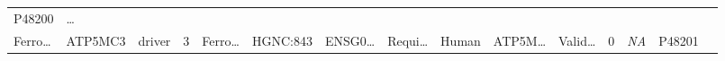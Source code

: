\documentclass[
]{article}
\begin{document}
\begin{longtable}[]{@{}lllllllllllllll@{}}
\begin{minipage}[t]{0.05\columnwidth}
P48200\strut
\end{minipage} & \begin{minipage}[t]{0.02\columnwidth}\raggedright
\ldots{}\strut
\end{minipage}\tabularnewline
\begin{minipage}[t]{0.05\columnwidth}\raggedright
Ferro\ldots{}\strut
\end{minipage} & \begin{minipage}[t]{0.04\columnwidth}\raggedright
ATP5MC3\strut
\end{minipage} & \begin{minipage}[t]{0.04\columnwidth}\raggedright
driver\strut
\end{minipage} & \begin{minipage}[t]{0.02\columnwidth}\raggedright
3\strut
\end{minipage} & \begin{minipage}[t]{0.05\columnwidth}\raggedright
Ferro\ldots{}\strut
\end{minipage} & \begin{minipage}[t]{0.05\columnwidth}\raggedright
HGNC:843\strut
\end{minipage} & \begin{minipage}[t]{0.05\columnwidth}\raggedright
ENSG0\ldots{}\strut
\end{minipage} & \begin{minipage}[t]{0.05\columnwidth}\raggedright
Requi\ldots{}\strut
\end{minipage} & \begin{minipage}[t]{0.04\columnwidth}\raggedright
Human\strut
\end{minipage} & \begin{minipage}[t]{0.05\columnwidth}\raggedright
ATP5M\ldots{}\strut
\end{minipage} & \begin{minipage}[t]{0.05\columnwidth}\raggedright
Valid\ldots{}\strut
\end{minipage} & \begin{minipage}[t]{0.05\columnwidth}\raggedright
0\strut
\end{minipage} & \begin{minipage}[t]{0.05\columnwidth}\raggedright
\emph{NA}\strut
\end{minipage} & \begin{minipage}[t]{0.05\columnwidth}\raggedright
P48201\strut
\end{minipage} & \begin{minipage}[t]{0.02\columnwidth}\raggedright

\end{minipage}
\end{longtable}
\end{document}

